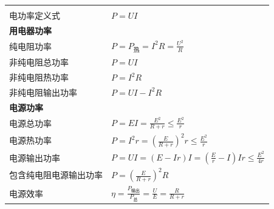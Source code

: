 \documentclass{../cheatsheet}
\begin{document}
	\begin{tabularx}{\columnwidth}{XX}
		\rowcolor{blue!30}
		\multicolumn{2}{l}{\parbox[c][2.5\ht\strutbox][c]{0.9\columnwidth}{\Large 用电器功率和电源功率}} \\
		电功率定义式&$P=UI$\\
		\multicolumn{2}{l}{\textbf{用电器功率}}\\
		纯电阻功率&$P=P_{\text{热}}=I^2R=\frac{U^2}{R}$\\
		非纯电阻总功率&$P=UI$\\
		非纯电阻热功率&$P=I^2R$\\
		非纯电阻输出功率&$P=UI-I^2R$\\
		\multicolumn{2}{l}{\textbf{电源功率}}\\
		电源总功率&$P=EI=\frac{E^2}{R+r}\le \frac{E^2}{r}$\\
		电源热功率&$P=I^2r=(\frac{E}{R+r})^2r\le \frac{E^2}{r}$\\
		电源输出功率&$P=UI=(E-Ir)I=(\frac{E}{r}-I)Ir\le \frac{E^2}{4r}$\\
		包含纯电阻电源输出功率&$P=(\frac{E}{R+r})^2R$\\
		电源效率&$\eta=\frac{P_{\text{输出}}}{P_{\text{总}}}=\frac U E=\frac{R}{R+r}$\\
	\end{tabularx}\\
\end{document}
